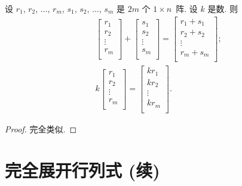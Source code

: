 \documentclass[../libro.tex]{subfiles}
\begin{document}
\begin{theorem}
    设
    \(r_1\), \(r_2\), \(\dots\), \(r_m\),
    \(s_1\), \(s_2\), \(\dots\), \(s_m\)
    是 \(2m\) 个 \(1 \times n\)~阵.
    设 \(k\) 是数.
    则
    \begin{align*}
        &
        \begin{bmatrix}
            r_1    \\
            r_2    \\
            \vdots \\
            r_m    \\
        \end{bmatrix}
        +
        \begin{bmatrix}
            s_1    \\
            s_2    \\
            \vdots \\
            s_m    \\
        \end{bmatrix}
        =
        \begin{bmatrix}
            r_1 + s_1 \\
            r_2 + s_2 \\
            \vdots    \\
            r_m + s_m \\
        \end{bmatrix}; \\
        & k
        \begin{bmatrix}
            r_1    \\
            r_2    \\
            \vdots \\
            r_m    \\
        \end{bmatrix}
        =
        \begin{bmatrix}
            kr_1   \\
            kr_2   \\
            \vdots \\
            kr_m   \\
        \end{bmatrix}.
    \end{align*}
\end{theorem}

\begin{proof}
    完全类似.
\end{proof}

\KunAsteriskoEnEnhavtabelo
\section{完全展开行列式 (续)}
\SenAsteriskoEnEnhavtabelo
\end{document}

